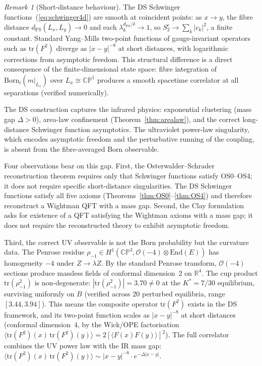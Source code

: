 \documentclass[11pt,a4paper]{article}
\theoremstyle{definition}
\theoremstyle{remark}
\newtheorem{remark}[theorem]{Remark}
\newcommand{\CP}{\mathbb{CP}}
\newcommand{\R}{\mathbb{R}}
\begin{document}
\begin{remark}[Short-distance behaviour]\label{rem:uv}
The DS Schwinger functions~(\ref{eq:schwinger4d}) are smooth at coincident points: as $x\to y$, the fibre distance $d_{\mathrm{FS}}(L_x,L_y)\to 0$ and each $\lambda_k^{d_{\mathrm{FS}}/\delta}\to 1$, so $S_2^c\to\sum_k|c_k|^2$, a finite constant. Standard Yang--Mills two-point functions of gauge-invariant operators such as $\mathrm{tr}(F^2)$ diverge as $|x-y|^{-8}$ at short distances, with logarithmic corrections from asymptotic freedom. This structural difference is a direct consequence of the finite-dimensional state space: fibre integration of $\mathrm{Born}_i(m|_{L_x})$ over $L_x\cong\CP^1$ produces a smooth spacetime correlator at all separations (verified numerically).

The DS construction captures the infrared physics: exponential clustering (mass gap $\Delta>0$), area-law confinement (Theorem~\ref{thm:arealaw}), and the correct long-distance Schwinger function asymptotics. The ultraviolet power-law singularity, which encodes asymptotic freedom and the perturbative running of the coupling, is absent from the fibre-averaged Born observable.

Four observations bear on this gap. First, the Osterwalder--Schrader reconstruction theorem requires only that Schwinger functions satisfy OS0--OS4; it does not require specific short-distance singularities. The DS Schwinger functions satisfy all five axioms (Theorems~\ref{thm:OS0}--\ref{thm:OS4}) and therefore reconstruct a Wightman QFT with a mass gap. Second, the Clay formulation asks for existence of a QFT satisfying the Wightman axioms with a mass gap; it does not require the reconstructed theory to exhibit asymptotic freedom.

Third, the correct UV observable is not the Born probability but the curvature data. The Penrose residue $\rho_{-1}\in H^1(\CP^3,\mathcal{O}(-4)\otimes\mathrm{End}(E))$ has homogeneity $-4$ under $Z\to\lambda Z$. By the standard Penrose transform, $\mathcal{O}(-4)$ sections produce massless fields of conformal dimension~$2$ on $\R^4$. The cup product $\mathrm{tr}(\rho_{-1}^2)$ is non-degenerate: $|\mathrm{tr}(\rho_{-1}^2)|=3.70\neq 0$ at the $K^*=7/30$ equilibrium, surviving uniformly on $B$ (verified across $20$ perturbed equilibria, range $[3.44,3.94]$). This means the composite operator $\mathrm{tr}(F^2)$ exists in the DS framework, and its two-point function scales as $|x-y|^{-8}$ at short distances (conformal dimension~$4$, by the Wick/OPE factorisation $\langle\mathrm{tr}(F^2)(x)\,\mathrm{tr}(F^2)(y)\rangle=2[\langle F(x)F(y)\rangle]^2$). The full correlator combines the UV power law with the IR mass gap: $\langle\mathrm{tr}(F^2)(x)\,\mathrm{tr}(F^2)(y)\rangle\sim|x-y|^{-8}\cdot e^{-\Delta|x-y|}$.


\end{remark}
\end{document}
